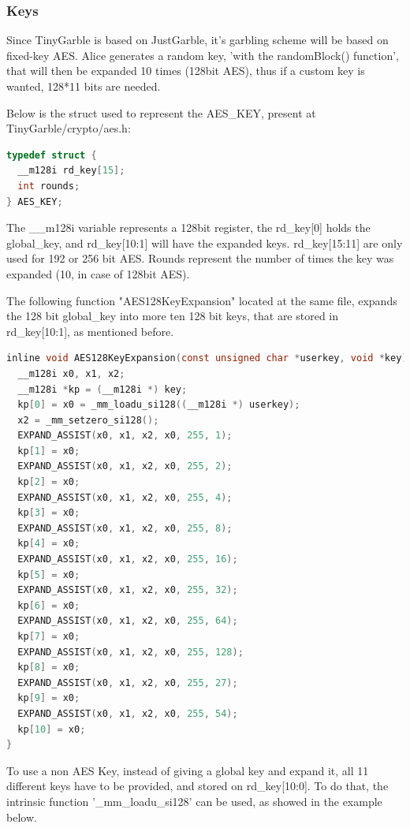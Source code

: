 \begin{refsection}
\subsubsection{Keys}

Since TinyGarble is based on JustGarble, it's garbling scheme will be based on fixed-key AES.
Alice generates a random key, 'with the randomBlock() function', that will then be expanded 10 times (128bit AES), thus if a custom key is wanted, 128*11 bits are needed.

Below is the struct used to represent the AES\_KEY, present at TinyGarble/crypto/aes.h:

\begin{lstlisting}[caption={AES\_KEY struct}, language=C, captionpos=b]
typedef struct {
  __m128i rd_key[15];
  int rounds;
} AES_KEY;
\end{lstlisting}

The \_\_m128i variable represents a 128bit register, the rd\_key[0] holds the global\_key, and rd\_key[10:1] will have the expanded keys. rd\_key[15:11] are only used for 192 or 256 bit AES. Rounds represent the number of times the key was expanded (10, in case of 128bit AES).

The following function "AES128KeyExpansion" located at the same file, expands the 128 bit global\_key into more ten 128 bit keys, that are stored in rd\_key[10:1], as mentioned before.

\begin{lstlisting}[caption={AES Expansion function}, language=C, captionpos=b]
inline void AES128KeyExpansion(const unsigned char *userkey, void *key) {
  __m128i x0, x1, x2;
  __m128i *kp = (__m128i *) key;
  kp[0] = x0 = _mm_loadu_si128((__m128i *) userkey);
  x2 = _mm_setzero_si128();
  EXPAND_ASSIST(x0, x1, x2, x0, 255, 1);
  kp[1] = x0;
  EXPAND_ASSIST(x0, x1, x2, x0, 255, 2);
  kp[2] = x0;
  EXPAND_ASSIST(x0, x1, x2, x0, 255, 4);
  kp[3] = x0;
  EXPAND_ASSIST(x0, x1, x2, x0, 255, 8);
  kp[4] = x0;
  EXPAND_ASSIST(x0, x1, x2, x0, 255, 16);
  kp[5] = x0;
  EXPAND_ASSIST(x0, x1, x2, x0, 255, 32);
  kp[6] = x0;
  EXPAND_ASSIST(x0, x1, x2, x0, 255, 64);
  kp[7] = x0;
  EXPAND_ASSIST(x0, x1, x2, x0, 255, 128);
  kp[8] = x0;
  EXPAND_ASSIST(x0, x1, x2, x0, 255, 27);
  kp[9] = x0;
  EXPAND_ASSIST(x0, x1, x2, x0, 255, 54);
  kp[10] = x0;
}
\end{lstlisting}

To use a non AES Key, instead of giving a global key and expand it, all 11 different keys have to be provided, and stored on rd\_key[10:0].
To do that, the intrinsic function '\_mm\_loadu\_si128' can be used, as showed in the example below.


\end{refsection}
